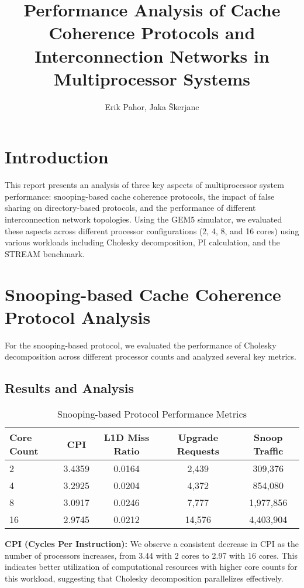 \documentclass[9pt]{IEEEtran}
\title{\vspace{0ex}Performance Analysis of Cache Coherence Protocols and Interconnection Networks in Multiprocessor Systems}
\author{Erik Pahor, Jaka Škerjanc\vspace{-4.0ex}}
\begin{document}
\maketitle

\section{Introduction}
This report presents an analysis of three key aspects of multiprocessor system performance: snooping-based cache coherence protocols, the impact of false sharing on directory-based protocols, and the performance of different interconnection network topologies. Using the GEM5 simulator, we evaluated these aspects across different processor configurations (2, 4, 8, and 16 cores) using various workloads including Cholesky decomposition, PI calculation, and the STREAM benchmark.

\section{Snooping-based Cache Coherence Protocol Analysis}
For the snooping-based protocol, we evaluated the performance of Cholesky decomposition across different processor counts and analyzed several key metrics.

\subsection{Results and Analysis}

\begin{table}[htbp]
\centering
\caption{Snooping-based Protocol Performance Metrics}
\begin{adjustbox}{max width=\columnwidth}
\begin{tabular}{@{}lcccc@{}}
\toprule
Core Count & CPI & L1D Miss Ratio & Upgrade Requests & Snoop Traffic \\
\midrule
2  & 3.4359 & 0.0164 & 2,439 & 309,376 \\
4  & 3.2925 & 0.0204 & 4,372 & 854,080 \\
8  & 3.0917 & 0.0246 & 7,777 & 1,977,856 \\
16 & 2.9745 & 0.0212 & 14,576 & 4,403,904 \\
\bottomrule
\end{tabular}
\end{adjustbox}
\end{table}

\textbf{CPI (Cycles Per Instruction):} We observe a consistent decrease in CPI as the number of processors increases, from 3.44 with 2 cores to 2.97 with 16 cores. This indicates better utilization of computational resources with higher core counts for this workload, suggesting that Cholesky decomposition parallelizes effectively.
\end{document}
